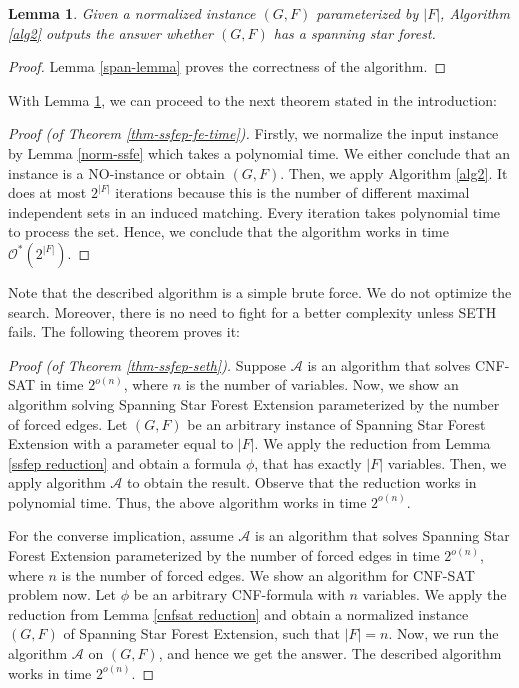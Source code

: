 \documentclass[en]{pracamgr}
\newtheorem{lemma}{Lemma}
\theoremstyle{definition}
\newcommand{\ssfep}{{\sc Spanning Star Forest Extension}}
\newcommand{\cnfsat}{{\sc CNF-SAT}}
\begin{document}
\begin{lemma}\label{alg2-correctness}
	Given a normalized instance $(G,F)$ parameterized by $|F|$, Algorithm \ref{alg2} outputs the answer whether $(G,F)$ has a spanning star forest.
\end{lemma}

\begin{proof}
	Lemma \ref{span-lemma} proves the correctness of the algorithm.
\end{proof}

With Lemma \ref{alg2-correctness}, we can proceed to the next theorem stated in the introduction:

\begin{proof}[Proof (of Theorem \ref{thm-ssfep-fe-time})]
	Firstly, we normalize the input instance by Lemma \ref{norm-ssfe} which takes a polynomial time. We either conclude that an instance is a NO-instance or obtain $(G,F)$. Then, we apply Algorithm \ref{alg2}. It does at most $2^{|F|}$ iterations because this is the number of different maximal independent sets in an induced matching. Every iteration takes polynomial time to process the set. Hence, we conclude that the algorithm works in time $\mathcal{O}^*(2^{|F|})$.
\end{proof}

Note that the described algorithm is a simple brute force. We do not optimize the search. Moreover, there is no need to fight for a better complexity unless SETH fails. The following theorem proves it:

\begin{proof}[Proof (of Theorem \ref{thm-ssfep-seth})]
	Suppose $\mathcal{A}$ is an algorithm that solves \cnfsat{} in time $2^{o(n)}$, where $n$ is the number of variables. Now, we show an algorithm solving \ssfep{} parameterized by the number of forced edges. Let $(G,F)$ be an arbitrary instance of \ssfep{} with a parameter equal to $|F|$. We apply the reduction from Lemma \ref{ssfep reduction} and obtain a formula $\phi$, that has exactly $|F|$ variables. Then, we apply algorithm $\mathcal{A}$ to obtain the result. Observe that the reduction works in polynomial time. Thus, the above algorithm works in time $2^{o(n)}$.
	
	For the converse implication, assume $\mathcal{A}$ is an algorithm that solves \ssfep{} parameterized by the number of forced edges in time $2^{o(n)}$, where $n$ is the number of forced edges. We show an algorithm for \cnfsat{} problem now. Let $\phi$ be an arbitrary CNF-formula with $n$ variables. We apply the reduction from Lemma \ref{cnfsat reduction} and obtain a normalized instance $(G,F)$ of \ssfep{}, such that $|F|=n$. Now, we run the algorithm $\mathcal{A}$ on $(G,F)$, and hence we get the answer. The described algorithm works in time $2^{o(n)}$.
\end{proof}
\end{document}
